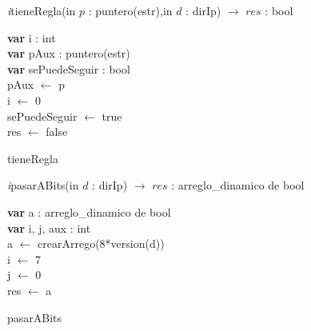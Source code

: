 \textit{i}tieneRegla(in $p$ : puntero(estr),in $d$ : dirIp)   $\longrightarrow$	$res$ : bool\\
\begin{algorithm}[H]
\BlankLine	
\textbf{var} i : int\\
\textbf{var} pAux : puntero(estr) 	\\
\textbf{var} sePuedeSeguir : bool	\\
\BlankLine
pAux $\leftarrow$ p\\
i $\leftarrow$ 0\\
sePuedeSeguir $\leftarrow$ true\\
res $\leftarrow$ false\\
\BlankLine
{}
\BlankLine
\BlankLine
{}
\caption{tieneRegla}
\end{algorithm}

      
\textit{i}pasarABits(in $d$ : dirIp) $\longrightarrow$ $res$ : arreglo\_dinamico de bool\\
\begin{algorithm}[H]
\BlankLine	
\textbf{var} a : arreglo\_dinamico de bool\\
\textbf{var} i, j, aux : int	\\
\BlankLine
a $\leftarrow$ crearArrego(8*version(d))\\
i $\leftarrow$ 7\\
j $\leftarrow$ 0\\
\BlankLine
{}
res	$\leftarrow$ a
\caption{pasarABits}
\end{algorithm}
